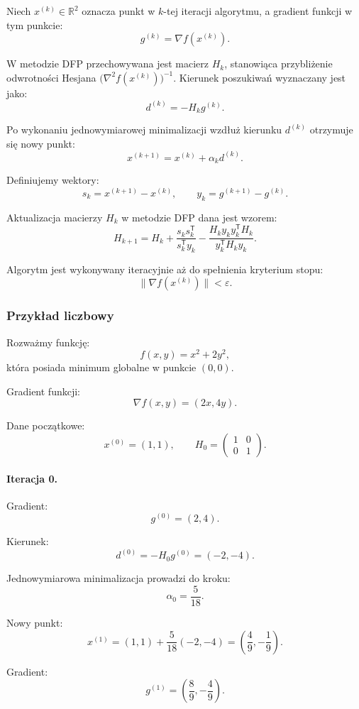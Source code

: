 \documentclass[10pt,a4paper]{article}
\begin{document}
Niech $x^{(k)} \in \mathbb{R}^2$ oznacza punkt w $k$-tej iteracji algorytmu,
a gradient funkcji w tym punkcie:
\[
g^{(k)} = \nabla f(x^{(k)}).
\]

W metodzie DFP przechowywana jest macierz $H_k$, stanowiąca przybliżenie
odwrotności Hesjana $\bigl(\nabla^2 f(x^{(k)})\bigr)^{-1}$.
Kierunek poszukiwań wyznaczany jest jako:
\[
d^{(k)} = - H_k g^{(k)}.
\]

Po wykonaniu jednowymiarowej minimalizacji wzdłuż kierunku $d^{(k)}$
otrzymuje się nowy punkt:
\[
x^{(k+1)} = x^{(k)} + \alpha_k d^{(k)}.
\]

Definiujemy wektory:
\[
s_k = x^{(k+1)} - x^{(k)}, \qquad
y_k = g^{(k+1)} - g^{(k)}.
\]

Aktualizacja macierzy $H_k$ w metodzie DFP dana jest wzorem:
\[
H_{k+1}
=
H_k
+
\frac{s_k s_k^{\mathsf T}}{s_k^{\mathsf T} y_k}
-
\frac{H_k y_k y_k^{\mathsf T} H_k}{y_k^{\mathsf T} H_k y_k}.
\]

Algorytm jest wykonywany iteracyjnie aż do spełnienia kryterium stopu:
\[
\|\nabla f(x^{(k)})\| < \varepsilon.
\]



\subsubsection{Przykład liczbowy}

Rozważmy funkcję:
\[
f(x,y) = x^2 + 2y^2,
\]
która posiada minimum globalne w punkcie $(0,0)$.

Gradient funkcji:
\[
\nabla f(x,y) = (2x, 4y).
\]

Dane początkowe:
\[
x^{(0)} = (1,1), \qquad
H_0 =
\begin{pmatrix}
1 & 0\\
0 & 1
\end{pmatrix}.
\]



\paragraph{Iteracja 0.}

Gradient:
\[
g^{(0)} = (2,4).
\]

Kierunek:
\[
d^{(0)} = -H_0 g^{(0)} = (-2,-4).
\]

Jednowymiarowa minimalizacja prowadzi do kroku:
\[
\alpha_0 = \frac{5}{18}.
\]

Nowy punkt:
\[
x^{(1)} =
(1,1) + \frac{5}{18}(-2,-4)
=
\left(\frac{4}{9}, -\frac{1}{9}\right).
\]

Gradient:
\[
g^{(1)} =
\left(\frac{8}{9}, -\frac{4}{9}\right).
\]
\end{document}
